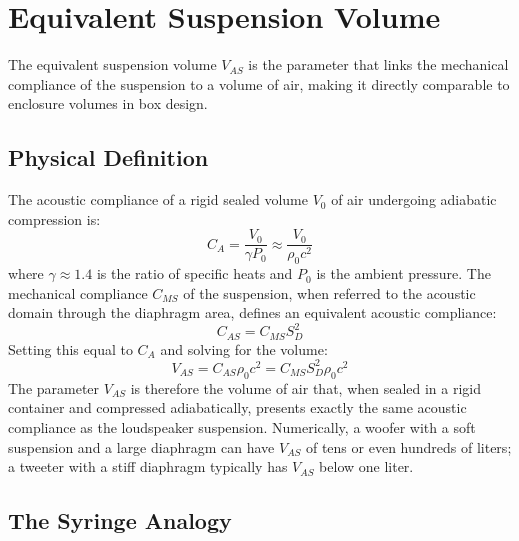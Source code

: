 \section{Equivalent Suspension Volume}
\label{sc:84}

The equivalent suspension volume \(V_{AS}\) is the parameter that links the mechanical compliance of the suspension to a volume of air, making it directly comparable to enclosure volumes in box design.

\subsection{Physical Definition}
\label{ssc:841}

The acoustic compliance of a rigid sealed volume \(V_0\) of air undergoing adiabatic compression is:
\[
C_A = \frac{V_0}{\gamma P_0} \approx \frac{V_0}{\rho_0 c^2}
\]
where \(\gamma \approx 1.4\) is the ratio of specific heats and \(P_0\) is the ambient pressure.
The mechanical compliance \(C_{MS}\) of the suspension, when referred to the acoustic domain through the diaphragm area, defines an equivalent acoustic compliance:
\[
C_{AS} = {C_{MS}}{S_D^{2}}
\]
Setting this equal to \(C_A\) and solving for the volume:
\begin{equation}
    V_{AS} = C_{AS} \rho_0 c^2 = C_{MS} S_D^2 \rho_0 c^2
    \label{eq:VAS}
\end{equation}
The parameter \(V_{AS}\) is therefore the volume of air that, when sealed in a rigid container and compressed adiabatically, presents exactly the same acoustic compliance as the loudspeaker suspension.
Numerically, a woofer with a soft suspension and a large diaphragm can have \(V_{AS}\) of tens or even hundreds of liters; a tweeter with a stiff diaphragm typically has \(V_{AS}\) below one liter.

\subsection{The Syringe Analogy}
\label{ssc:842}


